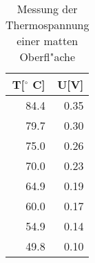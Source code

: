 \begin{table}
\begin{center}
\begin{tabular}{r|r}
T[$^\circ$ C] & U[V] \\
\hline
84.4 & 0.35 \\
79.7 & 0.30 \\
75.0 & 0.26 \\
70.0 & 0.23 \\
64.9 & 0.19 \\
60.0 & 0.17 \\
54.9 & 0.14 \\
49.8 & 0.10 \\
\end{tabular}
\caption[Thermospannung]{Messung der Thermospannung einer matten Oberfl"ache}
\label{matt}
\end{center}
\end{table}
